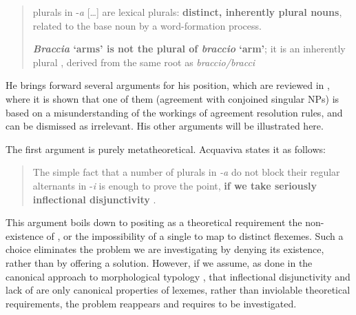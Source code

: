 \documentclass[output=paper]{langsci/langscibook}
\begin{document}
\begin{quote}
plurals in -\emph{a} {[}\ldots{}{]} are lexical plurals:
\textbf{distinct, inherently plural nouns}, related to the base noun by
a word-formation process. %
\citep[123, emphasis mine]{Acquaviva2008}%
%


\textbf{\emph{Braccia} `arms' is not the plural of \emph{braccio}
`arm'}; it is an inherently plural , derived from the same root as
\emph{braccio\slash{}bracci} %
\citep[157, emphasis mine]{Acquaviva2008}%
%
\end{quote}

He brings forward several arguments for his position, which are reviewed
in %
\citet[430--438]{Thornton2011b}%
%
, where it is shown that one
of them (agreement with conjoined singular NPs) is based on a
misunderstanding of the workings of  agreement resolution rules,
and can be dismissed as irrelevant. His other arguments will be
illustrated here.

The first argument is purely metatheoretical. Acquaviva states it as
follows:

\begin{quote}

The simple fact that a number of plurals in \emph{-a} do not block their
regular alternants in -\emph{i} is enough to prove the point, \textbf{if
we take seriously inflectional disjunctivity} %
\citep[145, emphasis mine]{Acquaviva2008}%
%
.
\end{quote}

This argument boils down to positing as a theoretical requirement the
non-existence of , or the impossibility of a single 
to map to distinct flexemes. Such a choice eliminates the problem we are
investigating by denying its existence, rather than by offering a
solution. However, if we assume, as done in the canonical approach to
morphological typology %
\citep{Corbett2005,Corbett2006,Corbett2007}%
%
, that inflectional
disjunctivity and lack of  are only canonical properties of
lexemes, rather than inviolable theoretical requirements, the problem
reappears and requires to be investigated.
\end{document}
